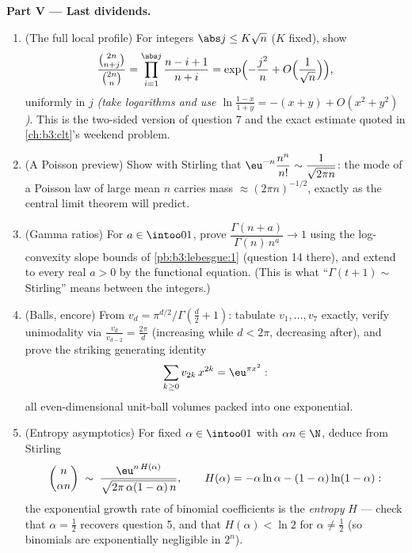 \begin{problem}
\medskip
\noindent\textbf{Part V --- Last dividends.}
\begin{enumerate}[resume]
  \item (The full local profile) For integers $\abs j \leq
        K\sqrt n$ ($K$ fixed), show
        \[
        \frac{\binom{2n}{n+j}}{\binom{2n}{n}} =
        \prod_{i=1}^{\abs j}\frac{n - i + 1}{n + i}
        = \exp\Bigl(-\frac{j^2}n +
        O\Bigl(\frac1{\sqrt n}\Bigr)\Bigr),
        \]
        uniformly in $j$ \emph{(take logarithms and use $\ln
        \frac{1-x}{1+y} = -(x + y) + O(x^2 + y^2)$)}. This is
        the two-sided version of question 7 and the exact
        estimate quoted in \cref{ch:b3:clt}'s weekend problem.
  \item (A Poisson preview) Show with Stirling that
        $\eu^{-n}\dfrac{n^n}{n!} \sim \dfrac1{\sqrt{2\pi n}}$:
        the mode of a Poisson law of large mean $n$ carries
        mass $\approx (2\pi n)^{-1/2}$, exactly as the central
        limit theorem will predict.
  \item (Gamma ratios) For $a \in \intoo01$, prove
        $\dfrac{\Gamma(n + a)}{\Gamma(n)\,n^a} \to 1$ using
        the log-convexity slope bounds of
        \cref{pb:b3:lebesgue:1} (question 14 there), and
        extend to every real $a > 0$ by the functional
        equation. (This is what ``$\Gamma(t+1) \sim$
        Stirling'' means between the integers.)
  \item (Balls, encore) From $v_d = \pi^{d/2}/\Gamma(\frac d2
        + 1)$: tabulate $v_1, \dots, v_7$ exactly, verify
        unimodality via $\frac{v_d}{v_{d-2}} = \frac{2\pi}d$
        (increasing while $d < 2\pi$, decreasing after), and
        prove the striking generating identity
        \[
        \sum_{k\geq0}v_{2k}\,x^{2k} = \eu^{\pi x^2} :
        \]
        all even-dimensional unit-ball volumes packed into one
        exponential.
  \item (Entropy asymptotics) For fixed $\alpha \in \intoo01$
        with $\alpha n \in \N$, deduce from Stirling
        \[
        \binom{n}{\alpha n} \;\sim\;
        \frac{\eu^{n\,H(\alpha)}}
        {\sqrt{2\pi\,\alpha(1-\alpha)\,n}},
        \qquad
        H(\alpha) = -\alpha\ln\alpha -
        (1-\alpha)\ln(1-\alpha) :
        \]
        the exponential growth rate of binomial coefficients
        is the \emph{entropy} $H$ --- check that $\alpha =
        \frac12$ recovers question 5, and that $H(\alpha) <
        \ln2$ for $\alpha \neq \frac12$ (so 
        binomials are exponentially negligible in $2^n$).

\end{enumerate}
\end{problem}
